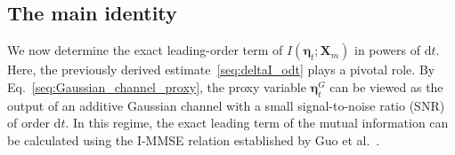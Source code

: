 
\subsection{The main identity}
\vspace*{-0.6\baselineskip}

We now determine the exact leading-order term of $I(\bm\eta_t;\bm X_m)$ in powers of $\mathrm dt$. Here, the previously derived estimate~\eqref{seq:deltaI_odt} plays a pivotal role. By Eq.~\eqref{seq:Gaussian_channel_proxy}, the proxy variable $\bm\eta_t^G$ can be viewed as the output of an additive Gaussian channel with a small signal-to-noise ratio (SNR) of order $\mathrm{d}t$. In this regime, the exact leading term of the mutual information can be calculated using the I-MMSE relation established by Guo et al.~\cite{guo2005mutual}.

